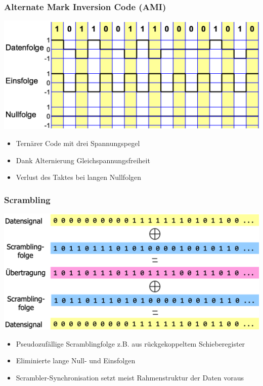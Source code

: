 \subsubsection{Alternate Mark Inversion Code (AMI)}
\begin{center}
    \includegraphics[width=\linewidth]{graphic/signale_analyisieren/Alternate Mark Inversion Code (AMI).png}
\end{center}
\vspace{-8pt}
\begin{itemize}
    \item Ternärer Code mit drei Spannungspegel
    \item Dank Alternierung Gleichspannungsfreiheit
    \item Verlust des Taktes bei langen Nullfolgen
\end{itemize}


\subsubsection{Scrambling}
\begin{center}
    \includegraphics[width=\linewidth]{graphic/signale_analyisieren/Scrambling.png}
\end{center}
\vspace{-8pt}
\begin{itemize}
    \item Pseudozufällige Scramblingfolge z.B. aus rückgekoppeltem Schieberegister
    \item Eliminierte lange Null- und Einsfolgen
    \item Scrambler-Synchronisation setzt meist Rahmenstruktur der Daten voraus
\end{itemize}



